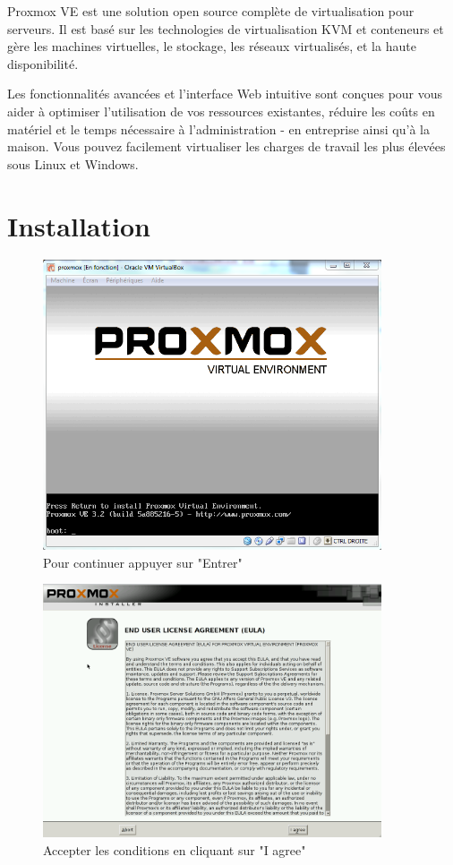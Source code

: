 \documentclass[12pt,a4paper]{article}
\begin{document}
Proxmox VE est une solution open source complète de virtualisation pour serveurs. Il est basé sur les technologies de virtualisation KVM et conteneurs et gère les machines virtuelles, le stockage, les réseaux virtualisés, et la haute disponibilité.

Les fonctionnalités avancées et l'interface Web intuitive sont conçues pour vous aider à optimiser l'utilisation de vos ressources existantes, réduire les coûts en matériel et le temps nécessaire à l'administration - en entreprise ainsi qu'à la maison. Vous pouvez facilement virtualiser les charges de travail les plus élevées sous Linux et Windows.
\newpage
\section{Installation}

\begin{figure}[!ht]
\center
\includegraphics[width=10cm]{Images/1.PNG} 
\caption{Pour continuer appuyer sur "Entrer"}
\end{figure}


\begin{figure}[!ht]
\center
\includegraphics[width=10cm]{Images/2.PNG} 
\caption{Accepter les conditions en cliquant sur "I agree"}
\end{figure}
\end{document}
